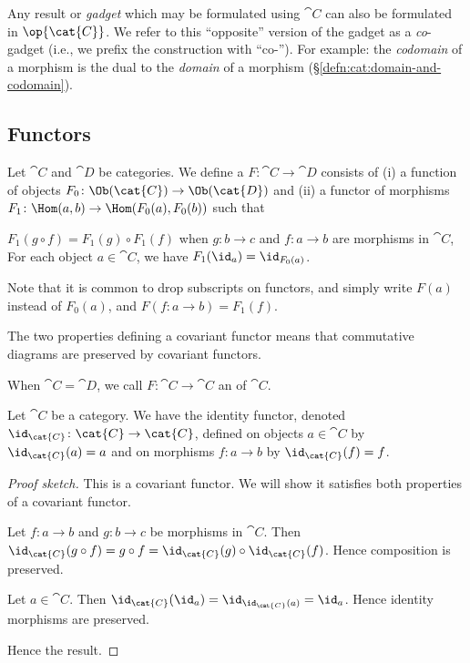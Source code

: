 \begin{remark}
Any result or \emph{gadget} which may be formulated using $\cat{C}$ can also be
formulated in $\op{\cat{C}}$. We refer to this ``opposite'' version of
the gadget as a \emph{co}-gadget (i.e., we prefix the construction
with ``co-''). For example: the \emph{codomain} of a morphism is the dual to the
\emph{domain} of a morphism (\S\ref{defn:cat:domain-and-codomain}).
\end{remark}

\subsection{Functors}

\begin{definition}
Let $\cat{C}$ and $\cat{D}$ be categories.
We define a  $F\colon\cat{C}\to\cat{D}$
consists of (i) a function of objects $F_{0}\colon\Ob(\cat{C})\to\Ob(\cat{D})$ 
and (ii) a functor of morphisms $F_{1}\colon\Hom(a,b)\to\Hom(F_{0}(a),F_{0}(b))$
such that
\begin{itemize}
 $F_{1}(g\circ f)=F_{1}(g)\circ F_{1}(f)$
when $g\colon b\to c$ and $f\colon a\to b$ are morphisms in $\cat{C}$,
 For each object $a\in\cat{C}$,
we have $F_{1}(\id_{a})=\id_{F_{0}(a)}$.
\end{itemize}
Note that it is common to drop subscripts on functors, and simply
write $F(a)$ instead of $F_{0}(a)$, and $F(f\colon a\to b) = F_{1}(f)$.

The two properties defining a covariant functor means that commutative
diagrams are preserved by covariant functors.

When $\cat{C}=\cat{D}$, we call $F\colon\cat{C}\to\cat{C}$ an
 of $\cat{C}$.
\end{definition}

\begin{example}
Let $\cat{C}$ be a category. We have the identity functor, denoted
$\id_{\cat{C}}\colon\cat{C}\to\cat{C}$, defined on objects
$a\in\cat{C}$ by $\id_{\cat{C}}(a)=a$ and on morphisms $f\colon a\to b$
by $\id_{\cat{C}}(f)=f$.

\begin{proof}[Proof sketch]
This is a covariant functor. We will show it satisfies both properties
of a covariant functor.

Let $f\colon a\to b$ and $g\colon b\to c$ be morphisms in
$\cat{C}$. Then $\id_{\cat{C}}(g\circ f)=g\circ f=\id_{\cat{C}}(g)\circ\id_{\cat{C}}(f)$.
Hence composition is preserved.

Let $a\in\cat{C}$. Then $\id_{\cat{C}}(\id_{a})=\id_{\id_{\cat{C}}(a)}=\id_{a}$.
Hence identity morphisms are preserved.

Hence the result.
\end{proof}
\end{example}

